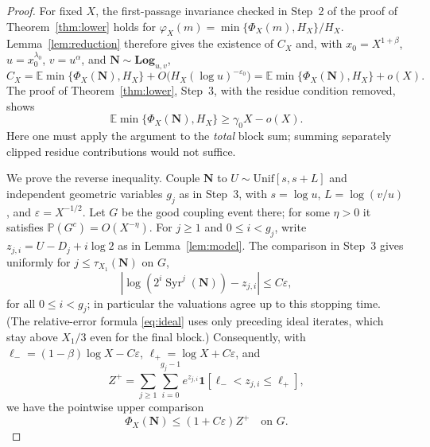 \begin{proof}
For fixed $X$, the first-passage invariance checked in Step~2 of
the proof of Theorem~\ref{thm:lower} holds for
$\varphi_X(m)=\min\{\Phi_X(m),H_X\}/H_X$.
Lemma~\ref{lem:reduction} therefore gives the existence of $C_X$
and, with $x_0=X^{1+\beta}$, $u=x_0^{\lambda_0}$,
$v=u^\alpha$, and $\mathbf N\sim\mathbf{Log}_{u,v}$,
\begin{equation}\label{eq:calib-window}
 C_X=\mathbb E\min\{\Phi_X(\mathbf N),H_X\}
  +O\bigl(H_X(\log u)^{-\varepsilon_0}\bigr)
 =\mathbb E\min\{\Phi_X(\mathbf N),H_X\}+o(X).
\end{equation}
The proof of Theorem~\ref{thm:lower}, Step~3, with the residue
condition removed, shows
\begin{equation}\label{eq:calib-lower}
 \mathbb E\min\{\Phi_X(\mathbf N),H_X\}\ge\gamma_0X-o(X).
\end{equation}
Here one must apply the argument to the \emph{total} block sum;
summing separately clipped residue contributions would not suffice.

We prove the reverse inequality. Couple $\mathbf N$ to
$U\sim\mathrm{Unif}[s,s+L]$ and independent geometric variables
$g_j$ as in Step~3, with $s=\log u$, $L=\log(v/u)$, and
$\varepsilon=X^{-1/2}$. Let $G$ be the good coupling event there;
for some $\eta>0$ it satisfies $\mathbb P(G^c)=O(X^{-\eta})$.
For $j\ge1$ and $0\le i<g_j$, write
$z_{j,i}=U-D_j+i\log2$ as in Lemma~\ref{lem:model}.
The comparison in Step~3 gives uniformly for
$j\le\tau_{X_1}(\mathbf N)$ on $G$,
\[
 \left|\log(2^i\operatorname{Syr}^j(\mathbf N))-z_{j,i}\right|
 \le C\varepsilon,
\]
for all $0\le i<g_j$; in particular the valuations agree up to
this stopping time. (The relative-error formula
\eqref{eq:ideal} uses only preceding ideal iterates, which stay
above $X_1/3$ even for the final block.) Consequently, with
$\ell_-=(1-\beta)\log X-C\varepsilon$,
$\ell_+=\log X+C\varepsilon$, and
\[
 Z^+=\sum_{j\ge1}\sum_{i=0}^{g_j-1}e^{z_{j,i}}
       \mathbf 1[\ell_-<z_{j,i}\le\ell_+],
\]
we have the pointwise upper comparison
\begin{equation}\label{eq:calib-upper-coupling}
 \Phi_X(\mathbf N)\le (1+C\varepsilon)Z^+\quad\text{on }G.
\end{equation}


\end{proof}
